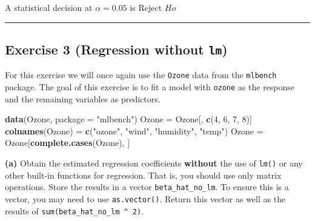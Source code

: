 \documentclass[
]{article}
\newenvironment{Shaded}{\begin{snugshade}}{\end{snugshade}}
\newcommand{\DataTypeTok}[1]{\textcolor[rgb]{0.13,0.29,0.53}{#1}}
\newcommand{\DecValTok}[1]{\textcolor[rgb]{0.00,0.00,0.81}{#1}}
\newcommand{\KeywordTok}[1]{\textcolor[rgb]{0.13,0.29,0.53}{\textbf{#1}}}
\newcommand{\NormalTok}[1]{#1}
\newcommand{\StringTok}[1]{\textcolor[rgb]{0.31,0.60,0.02}{#1}}
\begin{document}
A statistical decision at \(\alpha = 0.05\) is Reject \(Ho\)

\begin{center}\rule{0.5\linewidth}{0.5pt}\end{center}

\hypertarget{exercise-3-regression-without-lm}{%
\subsection{\texorpdfstring{Exercise 3 (Regression without
\texttt{lm})}{Exercise 3 (Regression without lm)}}\label{exercise-3-regression-without-lm}}

For this exercise we will once again use the \texttt{Ozone} data from
the \texttt{mlbench} package. The goal of this exercise is to fit a
model with \texttt{ozone} as the response and the remaining variables as
predictors.

\begin{Shaded}
\begin{Highlighting}[]
\KeywordTok{data}\NormalTok{(Ozone, }\DataTypeTok{package =} \StringTok{"mlbench"}\NormalTok{)}
\NormalTok{Ozone =}\StringTok{ }\NormalTok{Ozone[, }\KeywordTok{c}\NormalTok{(}\DecValTok{4}\NormalTok{, }\DecValTok{6}\NormalTok{, }\DecValTok{7}\NormalTok{, }\DecValTok{8}\NormalTok{)]}
\KeywordTok{colnames}\NormalTok{(Ozone) =}\StringTok{ }\KeywordTok{c}\NormalTok{(}\StringTok{"ozone"}\NormalTok{, }\StringTok{"wind"}\NormalTok{, }\StringTok{"humidity"}\NormalTok{, }\StringTok{"temp"}\NormalTok{)}
\NormalTok{Ozone =}\StringTok{ }\NormalTok{Ozone[}\KeywordTok{complete.cases}\NormalTok{(Ozone), ]}
\end{Highlighting}
\end{Shaded}

\textbf{(a)} Obtain the estimated regression coefficients
\textbf{without} the use of \texttt{lm()} or any other built-in
functions for regression. That is, you should use only matrix
operations. Store the results in a vector \texttt{beta\_hat\_no\_lm}. To
ensure this is a vector, you may need to use \texttt{as.vector()}.
Return this vector as well as the results of
\texttt{sum(beta\_hat\_no\_lm\ \^{}\ 2)}.
\end{document}
